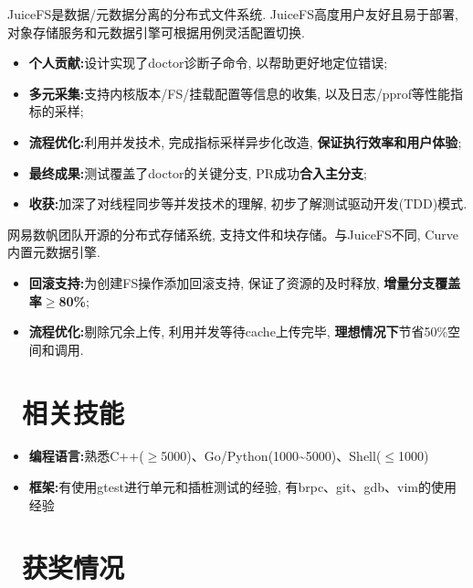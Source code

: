 \documentclass{resume}
\begin{document}
JuiceFS是数据/元数据分离的分布式文件系统. JuiceFS高度用户友好且易于部署, 对象存储服务和元数据引擎可根据用例灵活配置切换.
\begin{itemize}[parsep=0.3ex]
  \item \textbf{个人贡献:}设计实现了doctor诊断子命令, 以帮助更好地定位错误;
  \item \textbf{多元采集:}支持内核版本/FS/挂载配置等信息的收集, 以及日志/pprof等性能指标的采样;
  \item \textbf{流程优化:}利用并发技术, 完成指标采样异步化改造, \textbf{保证执行效率和用户体验};
  \item \textbf{最终成果:}测试覆盖了doctor的关键分支, PR成功\textbf{合入主分支};\enspace{}
  \item \textbf{收获:}加深了对线程同步等并发技术的理解, 初步了解测试驱动开发(TDD)模式.
\end{itemize}
网易数帆团队开源的分布式存储系统, 支持文件和块存储。与JuiceFS不同, Curve内置元数据引擎.
\begin{itemize}[parsep=0.3ex]
  \item \textbf{回滚支持:}为创建FS操作添加回滚支持, 保证了资源的及时释放, \textbf{增量分支覆盖率$\geq$80\%};\enspace{}
  \item \textbf{流程优化:}剔除冗余上传, 利用并发等待cache上传完毕, \textbf{理想情况下}节省50\%空间和调用.\enspace{}
\end{itemize}
\section{\faCogs\ 相关技能}
\begin{itemize}[parsep=0.5ex]
  \item \textbf{编程语言:}熟悉C++($\geq${5000})、Go/Python(1000\textasciitilde5000)、Shell($\leq$1000)
  \item \textbf{框架:}有使用gtest进行单元和插桩测试的经验, 有brpc、git、gdb、vim的使用经验
\end{itemize}
\section{\faHeartO\ 获奖情况}
\end{document}
